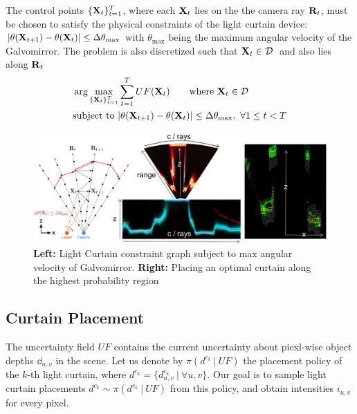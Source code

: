 The control points $\{\mathbf{X}_t\}_{t=1}^T$, where each $\mathbf{X}_t$ lies on the the camera ray $\mathbf{R}_t$, must be chosen to satisfy the physical constraints of the light curtain device: $|\theta(\mathbf{X}_{t+1}) - \theta(\mathbf{X}_t)| \leq \Delta \theta_\text{max}$ with $\theta_\text{max}$ being the maximum angular velocity of the Galvomirror. The problem is also discretized such that $\X_{t} \in \D\ $ and also lies along $\mathbf{R}_t$
\begin{align}
    &\arg \max_{\{\mathbf{X}_t\}_{t=1}^T} \sum_{t=1}^T UF(\mathbf{X}_t) \qquad \text{where}\ \mathbf{X}_t \in \mathcal{D}\ \nonumber\\
    &\text{subject to}\ |\theta(\mathbf{X}_{t+1}) - \theta(\mathbf{X}_t)| \leq \Delta \theta_\text{max},\ \forall 1 \leq t < T
    \label{eq:constraint}
\end{align}

\begin{figure}[h]
   \centering
   \begin{minipage}{0.5\textwidth}
       \centering
       \includegraphics[width=1.0\textwidth]{figures/planner.pdf}
   \end{minipage}\hfill
   \centering
   \caption{\textbf{Left:} Light Curtain constraint graph subject to max angular velocity of Galvomirror. \textbf{Right:} Placing an optimal curtain along the highest probability region}
   \label{fig:plannerfig}
\end{figure}

\subsection{Curtain Placement}

The uncertainty field $UF$ contains the current uncertainty about piexl-wise object depths $\dd_{u, v}$ in the scene. Let us denote by $\pi(d^{c_k}\ |\ UF)$ the placement policy of the $k$-th light curtain, where $d^{c_k} = \{d^{c_k}_{u, v}\ |\ \forall u, v\}$. Our goal is to sample light curtain placements $d^{c_k} \sim \pi(d^{c_k}\ |\ UF)$ from this policy, and obtain intensities $i_{u, v}$ for every pixel.


